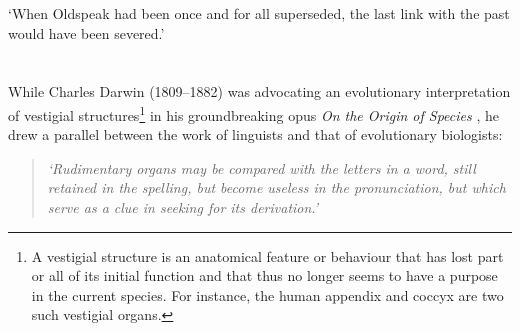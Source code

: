 \begin{savequote}[8cm]

	‘When Oldspeak had been once and for all superseded, the last link with the past would have been severed.’

\end{savequote}

\chapter*{\label{ch:preamble}}


While Charles Darwin (1809--1882) was advocating an evolutionary interpretation of vestigial structures\footnote{A vestigial structure is an anatomical feature or behaviour that has lost part or all of its initial function and that thus no longer seems to have a purpose in the current species. For instance, the human appendix and coccyx are two such vestigial organs.}
in his groundbreaking opus \textit{On the Origin of Species} \citeyearpar{darwin1859origin}, he drew a parallel between the work of linguists and that of evolutionary biologists:

\begin{quote}
	\textit{‘Rudimentary organs may be compared with the letters in a word, still retained in the spelling, but become useless in the pronunciation, but which serve as a clue in seeking for its derivation.’}
\end{quote}


